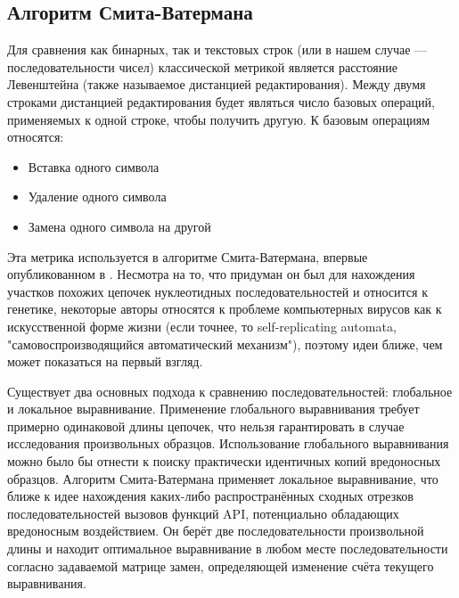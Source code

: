 \subsection {Алгоритм Смита-Ватермана}
Для сравнения как бинарных, так и текстовых строк (или в нашем случае --- последовательности чисел) классической метрикой является расстояние Левенштейна (также называемое дистанцией редактирования). Между двумя строками дистанцией редактирования будет являться число базовых операций, применяемых к одной строке, чтобы получить другую. К базовым операциям относятся:
\begin {itemize}
	\item Вставка одного символа
	\item Удаление одного символа
	\item Замена одного символа на другой
\end {itemize}
Эта  метрика используется в алгоритме Смита-Ватермана, впервые опубликованном в \cite{LOCALALIGNMENT}. Несмотра на то, что придуман он был для нахождения участков похожих цепочек нуклеотидных последовательностей и относится к генетике, некоторые авторы \cite{BLACKBOOK} относятся к проблеме компьютерных вирусов как к искусственной форме жизни (если точнее, то self-replicating automata, "самовоспроизводящийся автоматический механизм"), поэтому идеи ближе, чем может показаться на первый взгляд.

Существует два основных подхода к сравнению последовательностей: глобальное и локальное выравнивание. Применение глобального выравнивания требует примерно одинаковой длины цепочек, что нельзя гарантировать в случае исследования произвольных образцов. Использование глобального выравнивания можно было бы отнести к поиску практически идентичных копий вредоносных образцов. Алгоритм Смита-Ватермана применяет локальное выравнивание, что ближе к идее нахождения каких-либо распространённых сходных отрезков последовательностей вызовов функций API, потенциально обладающих вредоносным воздействием. Он берёт две последовательности произвольной длины и находит оптимальное выравнивание в любом месте последовательности согласно задаваемой матрице замен, определяющей изменение счёта текущего выравнивания. 

